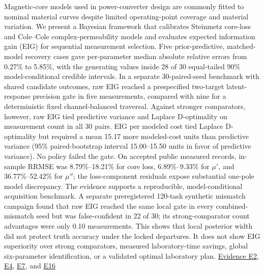 Magnetic-core models used in power-converter design are commonly fitted
to nominal material curves despite limited operating-point coverage and
material variation. We present a Bayesian framework that calibrates
Steinmetz core-loss and Cole--Cole complex-permeability models and
evaluates expected information gain (EIG) for sequential measurement
selection. Five prior-predictive, matched-model recovery cases gave
per-parameter median absolute relative errors from 0.27\% to 5.85\%,
with the generating values inside 28 of 30 equal-tailed 90\%
model-conditional credible intervals. In a separate 30-paired-seed
benchmark with shared candidate outcomes, raw EIG reached a prespecified
two-target latent-response precision gate in five measurements, compared
with nine for a deterministic fixed channel-balanced traversal. Against
stronger comparators, however, raw EIG tied predictive variance and
Laplace D-optimality on measurement count in all 30 pairs. EIG per
modeled cost tied Laplace D-optimality but required a mean 15.17 more
modeled-cost units than predictive variance (95\% paired-bootstrap
interval 15.00--15.50 units in favor of predictive variance). No policy
failed the gate. On accepted public measured records, in-sample RRMSE
was 8.79\%--18.21\% for core loss, 6.89\%--9.33\% for \(\mu'\), and
36.77\%--52.42\% for \(\mu''\); the loss-component residuals expose
substantial one-pole model discrepancy. The evidence supports a
reproducible, model-conditional acquisition benchmark. A separate
preregistered 120-task synthetic mismatch campaign found that raw EIG
reached the same local gate in every combined-mismatch seed but was
false-confident in 22 of 30; its strong-comparator count advantages were
only 0.10 measurements. This shows that local posterior width did not
protect truth accuracy under the locked departures. It does not show EIG
superiority over strong comparators, measured laboratory-time savings,
global six-parameter identification, or a validated optimal laboratory
plan.
\href{https://github.com/hoangduong6210/EIG-bayesian-for-Recover-potential-Physical-Parameter-of-MagComponent/blob/927bbcb6d0b862598fae87d2575a872bbd79b5f1/wiki/evidence/Evidence-Sources.md\#e2}{Evidence
E2},
\href{https://github.com/hoangduong6210/EIG-bayesian-for-Recover-potential-Physical-Parameter-of-MagComponent/blob/927bbcb6d0b862598fae87d2575a872bbd79b5f1/wiki/evidence/Evidence-Sources.md\#e4}{E4},
\href{https://github.com/hoangduong6210/EIG-bayesian-for-Recover-potential-Physical-Parameter-of-MagComponent/blob/927bbcb6d0b862598fae87d2575a872bbd79b5f1/wiki/evidence/Evidence-Sources.md\#e7}{E7},
and
\href{https://github.com/hoangduong6210/EIG-bayesian-for-Recover-potential-Physical-Parameter-of-MagComponent/blob/927bbcb6d0b862598fae87d2575a872bbd79b5f1/wiki/evidence/Evidence-Sources.md\#e16}{E16}
